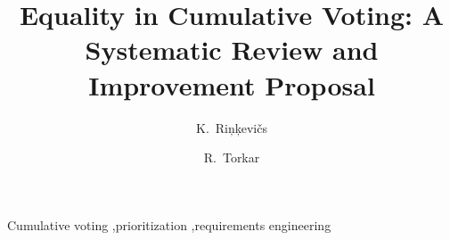 \begin{frontmatter}
\title{Equality in Cumulative Voting: A Systematic Review and Improvement Proposal}


\author[aff1]{K.~Ri{\c n}{\c k}evi{\v c}s}
\author[aff1,aff2]{R.~Torkar}
\address[aff1]{Blekinge Institute of Technology, Sweden}
\address[aff2]{Simula Research Laboratory, Norway}


\begin{abstract}

\end{abstract}

\begin{keyword}
Cumulative voting \sep prioritization \sep requirements engineering
\end{keyword}

\end{frontmatter}
